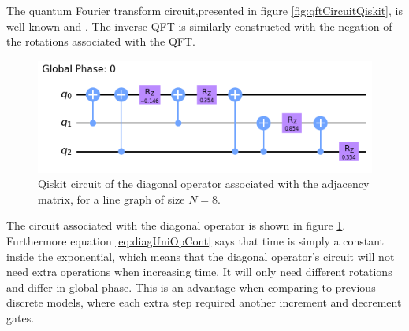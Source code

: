 \documentclass[../../dissertation.tex]{subfiles}
\begin{document}
The quantum Fourier transform circuit,presented in figure
\ref{fig:qftCircuitQiskit}, is well known and . The inverse QFT is similarly constructed with the
negation of the rotations associated with the QFT.\par
\begin{figure}[!h]
	\centering
	\includegraphics[scale=0.50]{img/Qiskit/ContQuantumWalk/Circuits/circDiag_N3_S1.png}
	\caption{Qiskit circuit of the diagonal operator associated with the adjacency matrix, for a line graph of size $N=8$.}
	\label{fig:diagCircuitQiskit}
\end{figure}
The circuit associated with the diagonal operator is shown in figure
\ref{fig:diagCircuitQiskit}. Furthermore equation \eqref{eq:diagUniOpCont} says
that time is simply a constant inside the exponential, which means that the
diagonal operator's circuit will not need extra operations when increasing
time. It will only need different rotations and differ in global phase.  This
is an advantage when comparing to previous discrete models,  where each extra
step required another increment and decrement gates.\par
\end{document}
